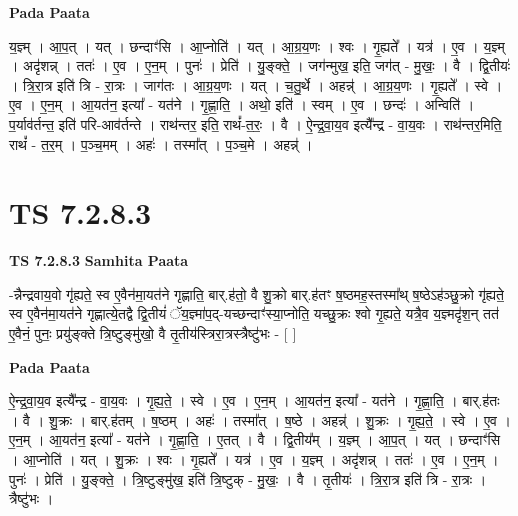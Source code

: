 \documentclass[17pt]{extarticle}
\begin{document}
\textbf{Pada Paata} \newline

य॒ज्ञ्म् । आ॒प॒त् । यत् । छन्दाꣳ॑सि । आ॒प्नोति॑ । यत् । आ॒ग्र॒य॒णः । श्वः । गृ॒ह्यते᳚ । यत्र॑ । ए॒व । य॒ज्ञ्म् । अदृ॑शन्न् । ततः॑ । ए॒व । ए॒न॒म् । पुनः॑ । प्रेति॑ । यु॒ङ्क्ते॒ । जग॑न्मुख॒ इति॒ जग॑त् - मु॒खः॒ । वै । द्वि॒तीयः॑ । त्रि॒रा॒त्र इति॑ त्रि - रा॒त्रः । जाग॑तः । आ॒ग्र॒य॒णः । यत् । च॒तु॒र्थे । अहन्न्॑ । आ॒ग्र॒य॒णः । गृ॒ह्यते᳚ । स्वे । ए॒व । ए॒न॒म् । आ॒यत॑न॒ इत्या᳚ - यत॑ने । गृ॒ह्णा॒ति॒ । अथो॒ इति॑ । स्वम् । ए॒व । छन्दः॑ । अन्विति॑ । प॒र्याव॑र्तन्त॒ इति॑ परि-आव॑र्तन्ते । राथ॑न्तर॒ इति॒ राथं᳚-त॒रः॒ । वै । ऐ॒न्द्र॒वा॒य॒व इत्यै᳚न्द्र - वा॒य॒वः । राथ॑न्तर॒मिति॒ राथं᳚ - त॒र॒म् । प॒ञ्च॒मम् । अहः॑ । तस्मा᳚त् । प॒ञ्च॒मे । अहन्न्॑ ।  \newline




\section*{ TS 7.2.8.3 }

\textbf{TS 7.2.8.3 } \newline
\textbf{Samhita Paata} \newline

-न्नैन्द्रवाय॒वो गृ॑ह्यते॒ स्व ए॒वैन॑मा॒यत॑ने गृह्णाति॒ बार्.ह॑तो॒ वै शु॒क्रो बार्.ह॑तꣳ ष॒ष्ठमह॒स्तस्मा᳚थ् ष॒ष्ठेऽह॑ञ्छु॒क्रो गृ॑ह्यते॒ स्व ए॒वैन॑मा॒यत॑ने गृह्णात्ये॒तद्वै द्वि॒तीयं॑ ॅय॒ज्ञ्मा॑प॒द्-यच्छन्दाꣳ॑स्या॒प्नोति॒ यच्छु॒क्रः श्वो गृ॒ह्यते॒ यत्रै॒व य॒ज्ञ्मदृ॑श॒न् तत॑ ए॒वैनं॒ पुनः॒ प्रयु॑ङ्क्ते त्रि॒ष्टुङ्मु॑खो॒ वै तृ॒तीय॑स्त्रिरा॒त्रस्त्रैष्टु॑भः - [  ] \newline

\textbf{Pada Paata} \newline

ऐ॒न्द्र॒वा॒य॒व इत्यै᳚न्द्र - वा॒य॒वः । गृ॒ह्य॒ते॒ । स्वे । ए॒व । ए॒न॒म् । आ॒यत॑न॒ इत्या᳚ - यत॑ने । गृ॒ह्णा॒ति॒ । बार्.ह॑तः । वै । शु॒क्रः । बार्.ह॑तम् । ष॒ष्ठम् । अहः॑ । तस्मा᳚त् । ष॒ष्ठे । अहन्न्॑ । शु॒क्रः । गृ॒ह्य॒ते॒ । स्वे । ए॒व । ए॒न॒म् । आ॒यत॑न॒ इत्या᳚ - यत॑ने । गृ॒ह्णा॒ति॒ । ए॒तत् । वै । द्वि॒तीय᳚म् । य॒ज्ञ्म् । आ॒प॒त् । यत् । छन्दाꣳ॑सि । आ॒प्नोति॑ । यत् । शु॒क्रः । श्वः । गृ॒ह्यते᳚ । यत्र॑ । ए॒व । य॒ज्ञ्म् । अदृ॑शन्न् । ततः॑ । ए॒व । ए॒न॒म् । पुनः॑ । प्रेति॑ । यु॒ङ्क्ते॒ । त्रि॒ष्टुङ्मु॑ख॒ इति॑ त्रि॒ष्टुक् - मु॒खः॒ । वै । तृ॒तीयः॑ । त्रि॒रा॒त्र इति॑ त्रि - रा॒त्रः । त्रैष्टु॑भः ।  \newline
\end{document}
